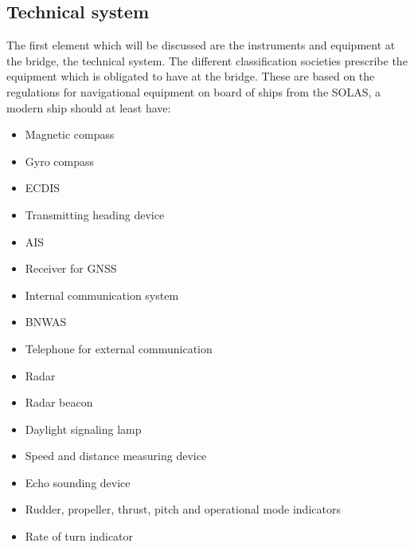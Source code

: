\subsection{Technical system}
The first element which will be discussed are the instruments and equipment at the bridge, the technical system. The different classification societies prescribe the equipment which is obligated to have at the bridge. These are based on the regulations for navigational equipment on board of ships from the \ac{SOLAS}, a modern ship should at least have:
\begin{multicols}{2}
	\begin{itemize}
		\item Magnetic compass
		\item Gyro compass
		\item \ac{ECDIS}
		\item Transmitting heading device
		\item \acf{AIS}
		\item Receiver for \ac{GNSS}
		\item Internal communication system
		\item \ac{BNWAS}
		\item Telephone for external communication
		\item Radar
		\item Radar beacon
		\item Daylight signaling lamp
		\item Speed and distance measuring device
		\item Echo sounding device
		\item Rudder, propeller, thrust, pitch and operational mode indicators
		\item Rate of turn indicator
	\end{itemize}
\end{multicols}


